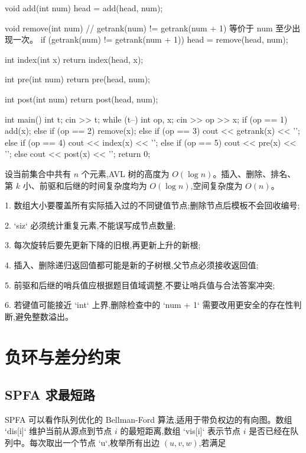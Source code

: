 \documentclass[UTF8,a4paper,11pt]{ctexart}
\newcommand{\topic}[1]{%
  \par\needspace{3\baselineskip}\vspace{0.45em}%
  \noindent{\bfseries\color{Primary}#1}\par\vspace{0.12em}%
}
\begin{document}
\begin{CodeBlock}
void add(int num) {
    head = add(head, num);
}

void remove(int num) {
    // getrank(num) != getrank(num + 1) 等价于 num 至少出现一次。
    if (getrank(num) != getrank(num + 1))
        head = remove(head, num);
}

int index(int x) {
    return index(head, x);
}

int pre(int num) {
    return pre(head, num);
}

int post(int num) {
    return post(head, num);
}

int main() {
    int t;
    cin >> t;
    while (t--) {
        int op, x;
        cin >> op >> x;
        if (op == 1)
            add(x);
        else if (op == 2)
            remove(x);
        else if (op == 3)
            cout << getrank(x) << '\n';
        else if (op == 4)
            cout << index(x) << '\n';
        else if (op == 5)
            cout << pre(x) << '\n';
        else
            cout << post(x) << '\n';
    }
    return 0;
}
\end{CodeBlock}

\clearpage
\topic{复杂度与使用注意}

设当前集合中共有 $n$ 个元素,AVL 树的高度为 $O(\log n)$。插入、删除、排名、第 $k$ 小、前驱和后继的时间复杂度均为 $O(\log n)$,空间复杂度为 $O(n)$。

1. 数组大小要覆盖所有实际插入过的不同键值节点;删除节点后模板不会回收编号;

2. `siz` 必须统计重复元素,不能误写成节点数量;

3. 每次旋转后要先更新下降的旧根,再更新上升的新根;

4. 插入、删除递归返回值都可能是新的子树根,父节点必须接收返回值;

5. 前驱和后继的哨兵值应根据题目值域调整,不要让哨兵值与合法答案冲突;

6. 若键值可能接近 `int` 上界,删除检查中的 `num + 1` 需要改用更安全的存在性判断,避免整数溢出。

\section{负环与差分约束}

\subsection{SPFA 求最短路}

SPFA 可以看作队列优化的 Bellman-Ford 算法,适用于带负权边的有向图。数组 `dis[i]` 维护当前从源点到节点 $i$ 的最短距离,数组 `vis[i]` 表示节点 $i$ 是否已经在队列中。每次取出一个节点 `u`,枚举所有出边 $(u,v,w)$,若满足
\end{document}
